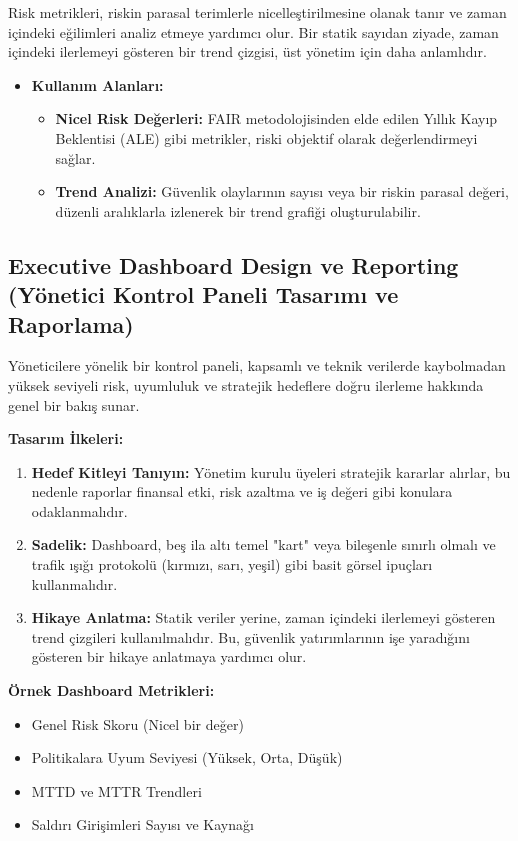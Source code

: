 Risk metrikleri, riskin parasal terimlerle nicelleştirilmesine olanak tanır ve zaman içindeki eğilimleri analiz etmeye yardımcı olur. Bir statik sayıdan ziyade, zaman içindeki ilerlemeyi gösteren bir trend çizgisi, üst yönetim için daha anlamlıdır.
\begin{itemize}
    \item \textbf{Kullanım Alanları:}
    \begin{itemize}
        \item \textbf{Nicel Risk Değerleri:} FAIR metodolojisinden elde edilen Yıllık Kayıp Beklentisi (ALE) gibi metrikler, riski objektif olarak değerlendirmeyi sağlar.
        \item \textbf{Trend Analizi:} Güvenlik olaylarının sayısı veya bir riskin parasal değeri, düzenli aralıklarla izlenerek bir trend grafiği oluşturulabilir.
    \end{itemize}
\end{itemize}

\subsection{Executive Dashboard Design ve Reporting (Yönetici Kontrol Paneli Tasarımı ve Raporlama)}

Yöneticilere yönelik bir kontrol paneli, kapsamlı ve teknik verilerde kaybolmadan yüksek seviyeli risk, uyumluluk ve stratejik hedeflere doğru ilerleme hakkında genel bir bakış sunar.

\textbf{Tasarım İlkeleri:}
\begin{enumerate}
    \item \textbf{Hedef Kitleyi Tanıyın:} Yönetim kurulu üyeleri stratejik kararlar alırlar, bu nedenle raporlar finansal etki, risk azaltma ve iş değeri gibi konulara odaklanmalıdır.
    \item \textbf{Sadelik:} Dashboard, beş ila altı temel "kart" veya bileşenle sınırlı olmalı ve trafik ışığı protokolü (kırmızı, sarı, yeşil) gibi basit görsel ipuçları kullanmalıdır.
    \item \textbf{Hikaye Anlatma:} Statik veriler yerine, zaman içindeki ilerlemeyi gösteren trend çizgileri kullanılmalıdır. Bu, güvenlik yatırımlarının işe yaradığını gösteren bir hikaye anlatmaya yardımcı olur.
\end{enumerate}

\textbf{Örnek Dashboard Metrikleri:}
\begin{itemize}
    \item Genel Risk Skoru (Nicel bir değer)
    \item Politikalara Uyum Seviyesi (Yüksek, Orta, Düşük)
    \item MTTD ve MTTR Trendleri
    \item Saldırı Girişimleri Sayısı ve Kaynağı
\end{itemize}

